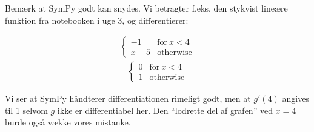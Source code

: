 \documentclass[letterpaper,10pt,english]{jupyterBook}
\begin{document}
\noindent{}

Bemærk at SymPy godt kan snydes. Vi betragter f.eks. den stykvist lineære funktion fra notebooken i uge 3, og differentierer:

\begin{sphinxVerbatim}[commandchars=\\\{\}]
         

   

   
         
\end{sphinxVerbatim}
\begin{equation*}
\begin{split}\displaystyle \begin{cases} -1 & \text{for}\: x < 4 \\x - 5 & \text{otherwise} \end{cases}\end{split}
\end{equation*}\begin{equation*}
\begin{split}\displaystyle \begin{cases} 0 & \text{for}\: x < 4 \\1 & \text{otherwise} \end{cases}\end{split}
\end{equation*}
\noindent{}

Vi ser at SymPy håndterer differentiationen rimeligt godt, men at \(g'(4)\) angives til 1 selvom \(g\) ikke er differentiabel her. Den “lodrette del af grafen” ved \(x=4\) burde også vække vores mistanke.
\end{document}
